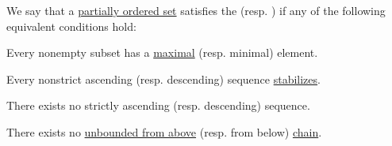 \begin{definition}\label{def:chain_condition}
  We say that a \hyperref[def:partially_ordered_set]{partially ordered set} satisfies the  (resp. ) if any of the following equivalent conditions hold:
  \begin{thmenum}
     Every nonempty subset has a \hyperref[def:extremal_points/maximal_and_minimal_element]{maximal} (resp. minimal) element.

     Every nonstrict ascending (resp. descending) sequence \hyperref[def:stabilizing_sequence]{stabilizes}.

     There exists no strictly ascending (resp. descending) sequence.

     There exists no \hyperref[def:extremal_points/bounds]{unbounded from above} (resp. from below) \hyperref[def:partial_order_chain]{chain}.
  \end{thmenum}
\end{definition}
